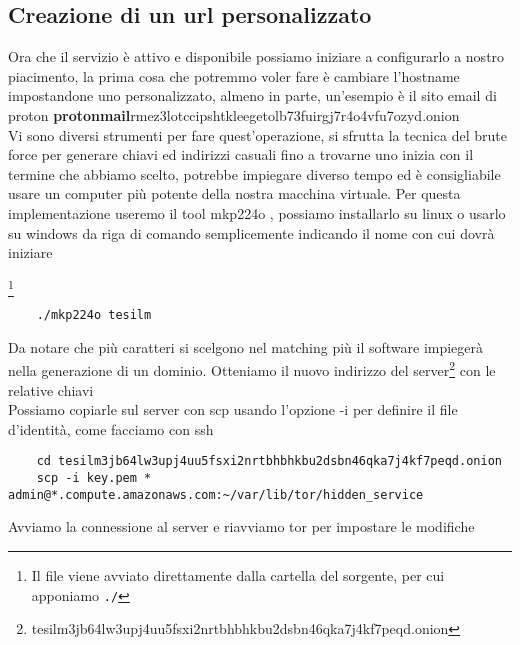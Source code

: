 
\newpage
\subsection{Creazione di un url personalizzato}
Ora che il servizio è attivo e disponibile possiamo iniziare a configurarlo a nostro piacimento, la prima cosa che potremmo voler fare è cambiare l'hostname impostandone uno personalizzato, almeno in parte, un'esempio è il sito email di proton \textbf{protonmail}rmez3lotccipshtkleegetolb73fuirgj7r4o4vfu7ozyd.onion \\
Vi sono diversi strumenti per fare quest'operazione, si sfrutta la tecnica del brute force per generare chiavi ed indirizzi casuali fino a trovarne uno inizia con il termine che abbiamo scelto, potrebbe impiegare diverso tempo ed è consigliabile usare un computer più potente della nostra macchina virtuale. 
Per questa implementazione useremo il tool mkp224o \cite{V3AddressGeneratorRepo}, possiamo installarlo su linux o usarlo su windows da riga di comando semplicemente indicando il nome con cui dovrà iniziare

\footnote{Il file viene avviato direttamente dalla cartella del sorgente, per cui apponiamo \lstinline{./}}
\begin{lstlisting}
    ./mkp224o tesilm
\end{lstlisting}
    
Da notare che più caratteri si scelgono nel matching più il software impiegerà nella generazione di un dominio. Otteniamo il nuovo indirizzo del server\footnote{tesilm3jb64lw3upj4uu5fsxi2nrtbhbhkbu2dsbn46qka7j4kf7peqd.onion} con le relative chiavi \\
Possiamo copiarle sul server con scp usando l'opzione -i per definire il file d'identità, come facciamo con ssh
    
\begin{lstlisting}
    cd tesilm3jb64lw3upj4uu5fsxi2nrtbhbhkbu2dsbn46qka7j4kf7peqd.onion
    scp -i key.pem * admin@*.compute.amazonaws.com:~/var/lib/tor/hidden_service
\end{lstlisting}

Avviamo la connessione al server e riavviamo tor per impostare le modifiche


